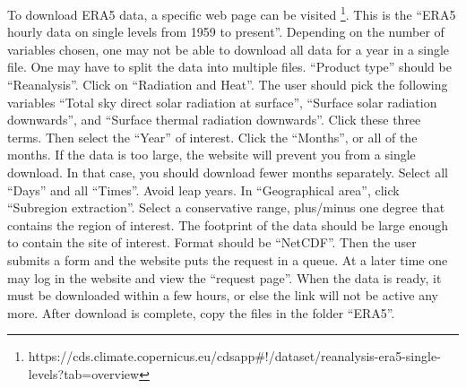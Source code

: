 \documentclass[12pt]{article}
\begin{document}
To download ERA5 data, a specific web page can be visited \footnote{https://cds.climate.copernicus.eu/cdsapp\#!/dataset/reanalysis-era5-single-levels?tab=overview}. This is the ``ERA5 hourly data on single levels from 1959 to present''. Depending on the number of variables chosen, one may not be able to download all data for a year in a single file. One may have to split the data into multiple files. ``Product type'' should be ``Reanalysis''. Click on ``Radiation and Heat''. The user should pick the following variables ``Total sky direct solar radiation at surface'', ``Surface solar radiation downwards'', and ``Surface thermal radiation downwards''. Click these three terms. Then select the ``Year'' of interest. Click the ``Months'', or all of the months. If the data is too large, the website will prevent you from a single download. In that case, you should download fewer months separately. Select all ``Days'' and all ``Times''. Avoid leap years. In ``Geographical area'', click ``Subregion extraction''. Select a conservative range, plus/minus one degree that contains the region of interest. The footprint of the data should be large enough to contain the site of interest. Format should be ``NetCDF''. Then the user submits a form and the website puts the request in a queue. At a later time one may log in the website and view the ``request page''. When the data is ready, it must be downloaded within a few hours, or else the link will not be active any more. After download is complete, copy the files in the folder ``ERA5''.
\end{document}
